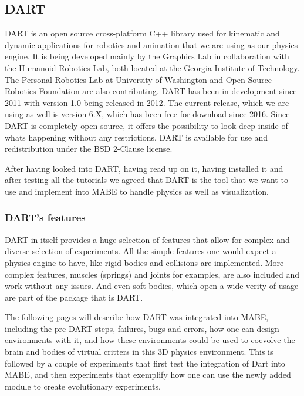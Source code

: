 \documentclass[12pt,oneside,listof=totoc,paper=a4,headings=small]{scrbook}
\begin{document}
\subsection{DART}
DART \cite{lee2018dart} is an open source cross-platform C++ library used for kinematic and dynamic applications for robotics and animation that we are using as our physics engine. It is being developed mainly by the Graphics Lab in collaboration with the Humanoid Robotics Lab, both located at the Georgia Institute of Technology. The Personal Robotics Lab at University of Washington and Open Source Robotics Foundation are also contributing.
DART has been in development since 2011 with version 1.0 being released in 2012. The current release, which we are using as well is version 6.X, which has been free for download since 2016.
Since DART is completely open source, it offers the possibility to look deep inside of whats happening without any restrictions.
DART is available for use and redistribution under the BSD 2-Clause license.

After having looked into DART, having read up on it, having installed it and after testing all the tutorials we agreed that DART is the tool that we want to use and implement into MABE to handle physics as well as visualization. 


\subsubsection{DART's features}

DART in itself provides a huge selection of features that allow for complex and diverse selection of experiments. All the simple features one would expect a physics engine to have, like rigid bodies and collisions are implemented. More complex features, muscles (springs) and joints for examples, are also included and work without any issues. And even soft bodies, which open a wide verity of usage are part of the package that is DART.

\newpage

The following pages will describe how DART was integrated into MABE, including the pre-DART steps, failures, bugs and errors, how one can design environments with it, and how these environments could be used to coevolve the brain and bodies of virtual critters in this 3D physics environment. This is followed by a couple of experiments that first test the integration of Dart into MABE, and then experiments that exemplify how one can use the newly added module to create evolutionary experiments. 
\end{document}
